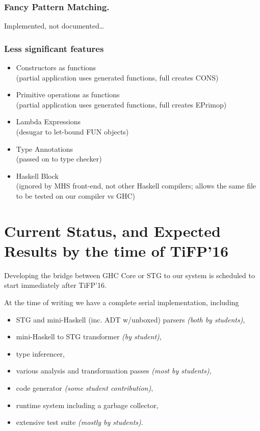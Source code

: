 \documentclass{llncs}
\begin{document}
\subsubsection{Fancy Pattern Matching.}
{\color{red}Implemented, not documented\dots}



\subsubsection{Less significant features}

\begin{itemize}
\item Constructors as functions \\
  (partial application uses generated functions, full creates CONS)

\item Primitive operations as functions \\
  (partial application uses generated functions, full creates EPrimop)

\item Lambda Expressions \\
  (desugar to let-bound FUN objects)

\item Type Annotations \\
  (passed on to type checker)

\item Haskell Block \\
  (ignored by MHS front-end, not other Haskell compilers;
  allows the same file to be tested on our compiler vs GHC)
\end{itemize}


\section{Current Status, and Expected Results by the time of TiFP'16}

Developing the bridge between GHC Core or STG to our system is scheduled
to start immediately after TiFP'16.

At the time of writing we have a complete serial implementation, including
\begin{itemize}
\item STG and mini-Haskell (inc. ADT w/unboxed) parsers \emph{(both by students)},
\item mini-Haskell to STG transformer \emph{(by student)},
\item type inferencer,
\item various analysis and transformation passes \emph{(most by students)},
\item code generator \emph{(some student contribution)},
\item runtime system including a garbage collector,
\item extensive test suite \emph{(mostly by students)}.
\end{itemize}
\end{document}
